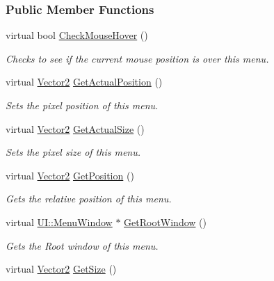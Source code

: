 \subsubsection*{Public Member Functions}
\begin{DoxyCompactItemize}
\item 
virtual bool \hyperlink{classphys_1_1UI_1_1Menu_af2514d2614322856f604be2e167d0872}{CheckMouseHover} ()
\begin{DoxyCompactList}\small\item\em Checks to see if the current mouse position is over this menu. \item\end{DoxyCompactList}\item 
virtual \hyperlink{classphys_1_1Vector2}{Vector2} \hyperlink{classphys_1_1UI_1_1Menu_a74a1b8e9b1c5d36c12e5a0a7f813c40a}{GetActualPosition} ()
\begin{DoxyCompactList}\small\item\em Sets the pixel position of this menu. \item\end{DoxyCompactList}\item 
virtual \hyperlink{classphys_1_1Vector2}{Vector2} \hyperlink{classphys_1_1UI_1_1Menu_af7566b83c50a4a02ac78d174d7c61817}{GetActualSize} ()
\begin{DoxyCompactList}\small\item\em Sets the pixel size of this menu. \item\end{DoxyCompactList}\item 
virtual \hyperlink{classphys_1_1Vector2}{Vector2} \hyperlink{classphys_1_1UI_1_1Menu_a3c19fe2596fe4049325cc580daa70387}{GetPosition} ()
\begin{DoxyCompactList}\small\item\em Gets the relative position of this menu. \item\end{DoxyCompactList}\item 
virtual \hyperlink{classphys_1_1UI_1_1MenuWindow}{UI::MenuWindow} $\ast$ \hyperlink{classphys_1_1UI_1_1Menu_a9926f44b122c804b68034a759ea4a967}{GetRootWindow} ()
\begin{DoxyCompactList}\small\item\em Gets the Root window of this menu. \item\end{DoxyCompactList}\item 
virtual \hyperlink{classphys_1_1Vector2}{Vector2} \hyperlink{classphys_1_1UI_1_1Menu_a81781199a62bbe7c2e7693ef301223b4}{GetSize} ()

\end{DoxyCompactItemize}
